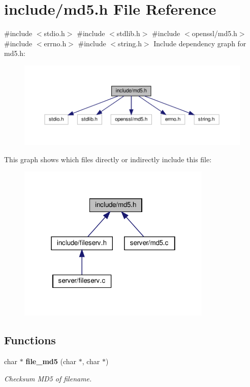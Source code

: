 \section{include/md5.h File Reference}
\label{md5_8h}
{\ttfamily \#include $<$stdio.\+h$>$}\newline
{\ttfamily \#include $<$stdlib.\+h$>$}\newline
{\ttfamily \#include $<$openssl/md5.\+h$>$}\newline
{\ttfamily \#include $<$errno.\+h$>$}\newline
{\ttfamily \#include $<$string.\+h$>$}\newline
Include dependency graph for md5.\+h\+:\nopagebreak
\begin{figure}[H]
\begin{center}
\leavevmode
\includegraphics[width=350pt]{md5_8h__incl}
\end{center}
\end{figure}
This graph shows which files directly or indirectly include this file\+:\nopagebreak
\begin{figure}[H]
\begin{center}
\leavevmode
\includegraphics[width=262pt]{md5_8h__dep__incl}
\end{center}
\end{figure}
\subsection*{Functions}
\begin{DoxyCompactItemize}
\item 
char $\ast$ \textbf{ file\+\_\+md5} (char $\ast$, char $\ast$)
\begin{DoxyCompactList}\small\item\em Checksum M\+D5 of filename. \end{DoxyCompactList}\end{DoxyCompactItemize}


